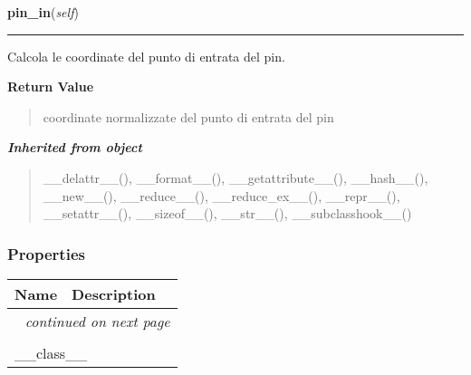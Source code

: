    \label{component:OutPin:pin_in}

    \vspace{0.5ex}

\hspace{.8\funcindent}\begin{boxedminipage}{\funcwidth}

    \raggedright \textbf{pin\_in}(\textit{self})

    \vspace{-1.5ex}

    \rule{\textwidth}{0.5\fboxrule}
\setlength{\parskip}{2ex}
    Calcola le coordinate del punto di entrata del pin.

\setlength{\parskip}{1ex}
      \textbf{Return Value}
    \vspace{-1ex}

      \begin{quote}
      coordinate normalizzate del punto di entrata del pin

      \end{quote}

    \end{boxedminipage}


\large{\textbf{\textit{Inherited from object}}}

\begin{quote}
\_\_delattr\_\_(), \_\_format\_\_(), \_\_getattribute\_\_(), \_\_hash\_\_(), \_\_new\_\_(), \_\_reduce\_\_(), \_\_reduce\_ex\_\_(), \_\_repr\_\_(), \_\_setattr\_\_(), \_\_sizeof\_\_(), \_\_str\_\_(), \_\_subclasshook\_\_()
\end{quote}


  \subsubsection{Properties}

    \vspace{-1cm}
\hspace{\varindent}\begin{longtable}{|p{\varnamewidth}|p{\vardescrwidth}|l}
\cline{1-2}
\cline{1-2} \centering \textbf{Name} & \centering \textbf{Description}& \\
\cline{1-2}
\endhead\cline{1-2}\multicolumn{3}{r}{\small\textit{continued on next page}}\\\endfoot\cline{1-2}
\endlastfoot\multicolumn{2}{|l|}{\textit{Inherited from object}}\\
\multicolumn{2}{|p{\varwidth}|}{\raggedright \_\_class\_\_}\\
\cline{1-2}
\end{longtable}


